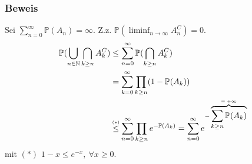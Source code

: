 \subsubsection{Beweis}
Sei $\sum_{n=0}^\infty\mathbb{P}(A_n)=\infty$. Z.z. $\mathbb{P}(\liminf_{n\to\infty}A_n^C)=0$.
\begin{align*}
    \mathbb{P}(\bigcup_{n\in\mathbb{N}}\bigcap_{k\geq n}A_k^C)&\leq\sum_{n=0}^\infty\mathbb{P}(\bigcap_{k\geq n}A_k^C)\\
    &=\sum_{k=0}^\infty\prod_{k\geq n}(1-\mathbb{P}(A_k))\\
    &\textabove{$(*)$}{\leq}\sum_{n=0}^\infty\prod_{k\geq n}e^{-\mathbb{P}(A_k)}=\sum_{n=0}^\infty e^{-\obr{\sum_{k\geq n}\mathbb{P}(A_k)}{$=+\infty$}}
\end{align*}
mit $(*)$ $1-x\leq e^{-x},\ \forall x\geq0$.
